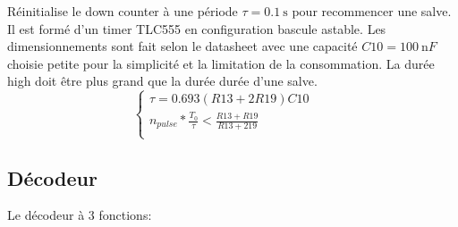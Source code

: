\documentclass[french]{layout/Report}
\begin{document}
\begin{description}[leftmargin=!,labelwidth=3cm, labelindent=\parindent]
	\item[Burst timer] Réinitialise le down counter à une période $\tau = \SI{0.1}{\second}$ pour recommencer une salve. Il est formé d'un timer TLC555 en configuration bascule astable. Les dimensionnements sont fait selon le datasheet \cite{TLC555} avec une capacité $\mathit{C10} = \SI{100}{\nano F}$ choisie petite pour la simplicité et la limitation de la consommation. La durée high doit être plus grand que la durée durée d'une salve.
		\begin{equation*}
			\begin{cases}
				\tau = 0.693(\mathit{R13}+2\mathit{R19})\mathit{C10} \\
				n_{pulse}*\frac{T_0}{\tau} < \frac{\mathit{R13}+\mathit{R19}}{\mathit{R13}+2\mathit{19}} \\
			\end{cases}
		\quad\
		\
	\end{equation*}

\end{description}

\subsection{Décodeur}
Le décodeur à 3 fonctions:
\end{document}
